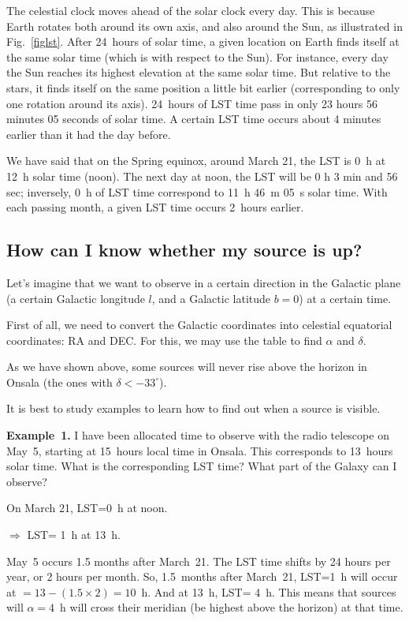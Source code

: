The celestial clock moves ahead of the solar clock every day. This 
is because Earth rotates both around its own axis, and also around the
Sun, as illustrated in Fig.~\ref{figlst}. 
After 24~hours of solar time, a given location on Earth 
finds itself at the same solar time (which is with respect to the Sun). 
For instance, every day the Sun reaches its highest elevation at the same 
solar time. 
But relative to the stars, it finds itself on 
the same position a little bit earlier (corresponding
to only one rotation around its axis). 24~hours of LST time
pass in only 
23 hours 56 minutes 05 seconds of solar time. A certain LST time
occurs about 4 minutes earlier than it had the day before. 

We have said that on the Spring equinox, around March 21, the LST is 0~h
at 12~h solar time (noon). The next day at noon, 
the LST will be 0 h 3 min and 56 sec; inversely, 0~h of LST time
correspond to 11~h 46~m 05~s solar time. 
With each passing month, a given LST time occurs 2~hours earlier. 

\subsection{How can I know whether my source is up?}
\label{app:visiblecoords}

Let's imagine that we want to observe in a certain direction in the
Galactic plane (a certain Galactic longitude $l$, and a Galactic 
latitude $b=0$) at a certain time. 

First of all, we need to convert the Galactic coordinates into 
celestial equatorial coordinates: RA and DEC. For this, we may use
the table to find $\alpha$ and $\delta$. 

As we have shown above, some sources will never rise above the horizon in Onsala 
(the ones with $\delta < -33^\circ$).   

It is best to study examples 
to learn how to find out when a source is visible. 

\bigskip
{\bf Example~1.} I have been allocated time to observe with the radio telescope
on May~5, starting at 15~hours local time in Onsala.  
This corresponds to 13~hours solar time. 
What is the corresponding LST time? What part of the Galaxy can I observe? 

\smallskip
On March 21, LST=0~h at noon. 

$\Rightarrow$ LST= 1~h at 13~h. 

May~5 occurs 1.5 months after March~21. The LST time shifts by
24 hours per year, or 2 hours per month. So, 1.5~months after
March~21, LST=1~h will occur at $=13 -(1.5\times 2) = 10$~h. 
And at 13~h, LST= 4~h. This means that sources will $\alpha=4$~h
will cross their meridian (be highest above the horizon) 
at that time.  

